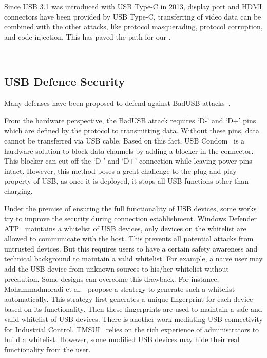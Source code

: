 Since USB 3.1 was introduced with USB Type-C in 2013, display port and HDMI
connectors have been provided by USB Type-C, transferring of video data can be
combined with the other attacks, like protocol masquerading,  protocol
corruption, and code injection. This has paved the path for our \tool.




\\


\subsection{USB Defence Security}
\label{subsec:usb_defence}
Many defenses have been proposed to defend against BadUSB attacks~\cite{sok}.

From the hardware perspective, the BadUSB attack requires `D-' and `D+' pins which
are defined by the protocol to transmitting data. Without these pins, data cannot 
be transferred via USB cable. Based
on this fact, USB Condom~\cite{Condom} is a hardware solution to block data
channels by adding a blocker in the connector. This blocker can cut off the `D-'
and `D+' connection while leaving power pins intact. However, this method poses
a great challenge to the plug-and-play property of USB, as once it is deployed, it
stops all USB functions other than charging.

Under the premise of ensuring the full functionality of USB devices, some works
try to improve the security during connection establishment.  Windows Defender
ATP~\cite{windenfenderwhite} maintains a whitelist of USB devices, only devices
on the whitelist are allowed to communicate with the host. This prevents all
potential attacks from untrusted devices. But this requires users to have a
certain safety awareness and technical background to maintain a valid
whitelist. For example, a naive user may add the USB device from unknown
sources to his/her whitelist without precaution. Some designs can overcome
this drawback. For instance, Mohammadmoradi et
al.~\cite{mohammadmoradi2018making} propose a strategy to generate such a
whitelist automatically. This strategy first generates a unique fingerprint for
each device based on its functionality. Then these fingerprints are used to
maintain a safe and valid whitelist of USB devices. There is another work
mediating USB connectivity for Industrial Control. TMSUI~\cite{yang2015tmsui}
relies on the rich experience of administrators to build a whitelist. However, some
modified USB devices may hide their real functionality from the user.

